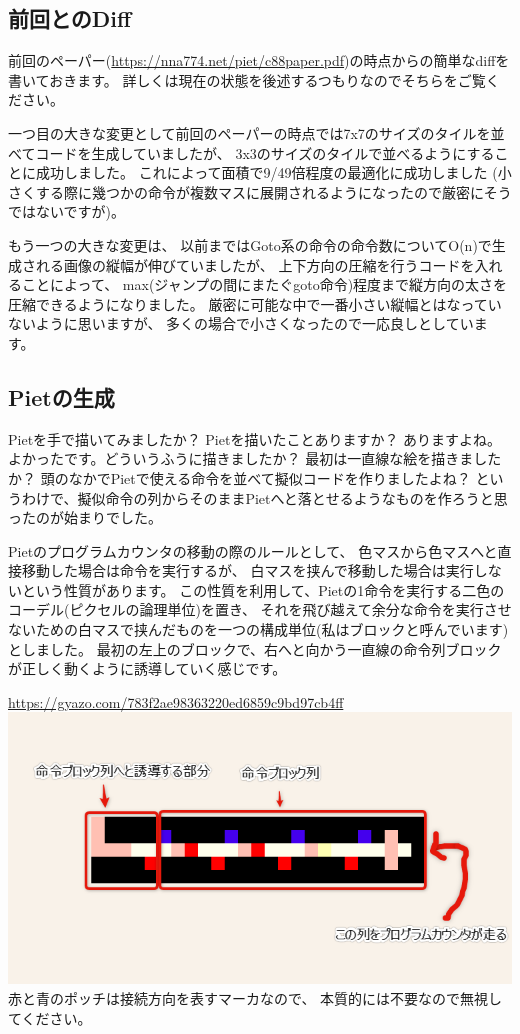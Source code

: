 \subsection{前回とのDiff}

前回のペーパー(\url{https://nna774.net/piet/c88paper.pdf})の時点からの簡単なdiffを書いておきます。
詳しくは現在の状態を後述するつもりなのでそちらをご覧ください。

一つ目の大きな変更として前回のペーパーの時点では7x7のサイズのタイルを並べてコードを生成していましたが、
3x3のサイズのタイルで並べるようにすることに成功しました。
これによって面積で9/49倍程度の最適化に成功しました
(小さくする際に幾つかの命令が複数マスに展開されるようになったので厳密にそうではないですが)。

もう一つの大きな変更は、
以前まではGoto系の命令の命令数についてO(n)で生成される画像の縦幅が伸びていましたが、
上下方向の圧縮を行うコードを入れることによって、
max(ジャンプの間にまたぐgoto命令)程度まで縦方向の太さを圧縮できるようになりました。
厳密に可能な中で一番小さい縦幅とはなっていないように思いますが、
多くの場合で小さくなったので一応良しとしています。

\subsection{Pietの生成}

Pietを手で描いてみましたか？ Pietを描いたことありますか？ ありますよね。
よかったです。どういうふうに描きましたか？
最初は一直線な絵を描きましたか？
頭のなかでPietで使える命令を並べて擬似コードを作りましたよね？
というわけで、擬似命令の列からそのままPietへと落とせるようなものを作ろうと思ったのが始まりでした。

Pietのプログラムカウンタの移動の際のルールとして、
色マスから色マスへと直接移動した場合は命令を実行するが、
白マスを挟んで移動した場合は実行しないという性質があります。
この性質を利用して、Pietの1命令を実行する二色のコーデル(ピクセルの論理単位)を置き、
それを飛び越えて余分な命令を実行させないための白マスで挟んだものを一つの構成単位(私はブロックと呼んでいます)としました。
最初の左上のブロックで、右へと向かう一直線の命令列ブロックが正しく動くように誘導していく感じです。

\url{https://gyazo.com/783f2ae98363220ed6859c9bd97cb4ff}\\
\href{https://gyazo.com/783f2ae98363220ed6859c9bd97cb4ff}{\includegraphics[width=\textwidth]{images/783f2ae98363220ed6859c9bd97cb4ff.png}} \\
赤と青のポッチは接続方向を表すマーカなので、
本質的には不要なので無視してください。

